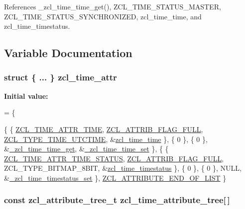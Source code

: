 References \-\_\-zcl\-\_\-time\-\_\-time\-\_\-get(), Z\-C\-L\-\_\-\-T\-I\-M\-E\-\_\-\-S\-T\-A\-T\-U\-S\-\_\-\-M\-A\-S\-T\-E\-R, Z\-C\-L\-\_\-\-T\-I\-M\-E\-\_\-\-S\-T\-A\-T\-U\-S\-\_\-\-S\-Y\-N\-C\-H\-R\-O\-N\-I\-Z\-E\-D, zcl\-\_\-time\-\_\-time, and zcl\-\_\-time\-\_\-timestatus.



\subsection{Variable Documentation}
\hypertarget{group__zcl__time_gaf9f59aed5fc15be3f99ff69f84be2b44}{
\subsubsection[{zcl\-\_\-time\-\_\-attr}]{\setlength{\rightskip}{0pt plus 5cm}struct \{ ... \}   zcl\-\_\-time\-\_\-attr}}\label{group__zcl__time_gaf9f59aed5fc15be3f99ff69f84be2b44}
{\bfseries Initial value\-:}
\begin{DoxyCode}
=
\{

   \{ \{ \hyperlink{group__zcl__time_ga6abf0e2cc70ac533ebe153a40185be63}{ZCL\_TIME\_ATTR\_TIME},
      \hyperlink{group__zcl_ga40104652d30fa17b7ea5dde9e8b788b8}{ZCL\_ATTRIB\_FLAG\_FULL},
      \hyperlink{group__zcl__types_ga8f678e97557cb052c0df4be97e9f1e82}{ZCL\_TYPE\_TIME\_UTCTIME},
      &\hyperlink{group__zcl__time_ga4e1da84a7e72ee1626d6328252fd621a}{zcl\_time\_time} \},
      \{ 0 \}, \{ 0 \},
      &\hyperlink{group__zcl__time_ga9c0749b71318a4f7fd28d9112ffd5462}{\_zcl\_time\_time\_get}, &\hyperlink{group__zcl__time_ga052b988d6d2448af6640028b45ee1f68}{\_zcl\_time\_time\_set}
       \},
   \{ \{ \hyperlink{group__zcl__time_ga5931aa648c777cb21c8337249b6e1699}{ZCL\_TIME\_ATTR\_TIME\_STATUS},
      \hyperlink{group__zcl_ga40104652d30fa17b7ea5dde9e8b788b8}{ZCL\_ATTRIB\_FLAG\_FULL},
      ZCL\_TYPE\_BITMAP\_8BIT,
      &\hyperlink{group__zcl__time_ga76f465fead960f138224d8e2a9a59469}{zcl\_time\_timestatus} \},
      \{ 0 \}, \{ 0 \},
      NULL, &\hyperlink{group__zcl__time_ga1b55e2dc0a4e0752c92dda9b65d349d2}{\_zcl\_time\_timestatus\_set} \},
   \hyperlink{group__zcl_gab05da20cf1dfaef97e20dfca2fd26d14}{ZCL\_ATTRIBUTE\_END\_OF\_LIST}
\}
\end{DoxyCode}
\hypertarget{group__zcl__time_gabd8e3bd6481f3841825a7596bc131b2f}{
\subsubsection[{zcl\-\_\-time\-\_\-attribute\-\_\-tree}]{\setlength{\rightskip}{0pt plus 5cm}const {\bf zcl\-\_\-attribute\-\_\-tree\-\_\-t} zcl\-\_\-time\-\_\-attribute\-\_\-tree\mbox{[}$\,$\mbox{]}}}\label{group__zcl__time_gabd8e3bd6481f3841825a7596bc131b2f}
